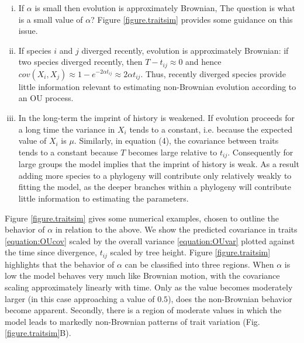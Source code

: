 \documentclass[a4paper,12pt]{article}
\begin{document}
\begin{enumerate}[(i)]
  
  \item If $\alpha$ is small then evolution is approximately Brownian, The question is what is a small value of $\alpha$? Figure \ref{figure.traitsim} provides some guidance on this issue.\\ 

  \item If species $i$ and $j$ diverged recently, evolution is approximately Brownian: if two species diverged recently, then $T - t_{ij} \approx 0$ and hence $cov(X_i, X_j) \approx 1 - e^{-2\alpha t_{ij}} \approx 2\alpha t_{ij}$. Thus, recently diverged species provide little information relevant to estimating non-Brownian evolution according to an OU process. \\ 

  \item In the long-term the imprint of history is weakened. If evolution proceeds for a long time the variance in $X_i$ tends to a constant, i.e. because the expected value of $X_i$ is $\mu$. Similarly, in equation (4), the covariance between traits tends to a constant because $T$ becomes large relative to $t_{ij}$. Consequently for large groups the model implies that the imprint of history is weak. As a result adding more species to a phylogeny will contribute only relatively weakly to fitting the model, as the deeper branches within a phylogeny will contribute little information to estimating the parameters.\\

\end{enumerate}

Figure \ref{figure.traitsim} gives some numerical examples, chosen to outline the behavior of $\alpha$ in relation to the above. We show the predicted covariance in traits \ref{equation:OUcov} scaled by the overall variance \ref{equation:OUvar} plotted against the time since divergence, $t_{ij}$ scaled by tree height. Figure \ref{figure.traitsim} highlights that the behavior of $\alpha$ can be classified into three regions. When $\alpha$ is low the model behaves very much like Brownian motion, with the covariance scaling approximately linearly with time. Only as the value becomes moderately larger (in this case approaching a value of $0.5$), does the non-Brownian behavior become apparent. Secondly, there is a region of moderate values in which the model leads to markedly non-Brownian patterns of trait variation (Fig. \ref{figure.traitsim}B).  
\end{document}
